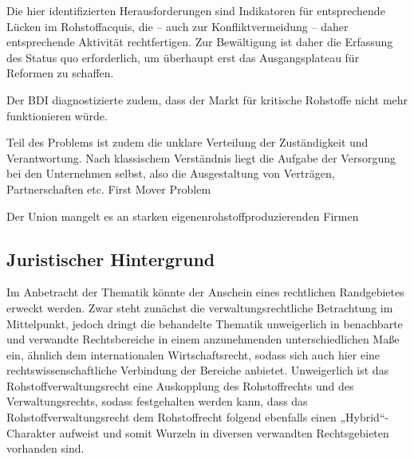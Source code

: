\documentclass[12pt,a4paper,oneside]{book} %
\begin{document}
Die hier identifizierten Herausforderungen sind Indikatoren für entsprechende Lücken im Rohstoffacquis, die -- auch zur Konfliktvermeidung -- daher entsprechende Aktivität rechtfertigen. Zur Bewältigung ist daher die Erfassung des Status quo erforderlich, um überhaupt erst das Ausgangsplateau für Reformen zu schaffen.

Der BDI diagnostizierte zudem, dass der Markt für kritische Rohstoffe nicht mehr funktionieren würde.

Teil des Problems ist zudem die unklare Verteilung der Zuständigkeit und Verantwortung. Nach klassischem Verständnis liegt die Aufgabe der Versorgung bei den Unternehmen selbst, also die Ausgestaltung von Verträgen, Partnerschaften etc. 
First Mover Problem

Der Union mangelt es an starken \glqq eigenen\grqq rohstoffproduzierenden Firmen
	
	\subsection{Juristischer Hintergrund}
	Im Anbetracht der Thematik könnte der Anschein eines rechtlichen Randgebietes erweckt werden. Zwar steht zunächst die verwaltungsrechtliche Betrachtung im Mittelpunkt, jedoch dringt die behandelte Thematik unweigerlich in benachbarte und verwandte Rechtsbereiche in einem anzunehmenden unterschiedlichen Maße ein, ähnlich dem internationalen Wirtschaftsrecht, sodass sich auch hier eine rechtswissenschaftliche Verbindung der Bereiche anbietet. \autocite[1, 2]{herdegen_internationales_2020} Unweigerlich ist das Rohstoffverwaltungsrecht eine Auskopplung des Rohstoffrechts und des Verwaltungsrechts, sodass festgehalten werden kann, dass das Rohstoffverwaltungsrecht dem Rohstoffrecht folgend ebenfalls einen „Hybrid“-Charakter aufweist und somit Wurzeln in diversen verwandten Rechtsgebieten vorhanden sind. \autocite[358]{terhechte_konsolidierung_2015}
	
\end{document}
